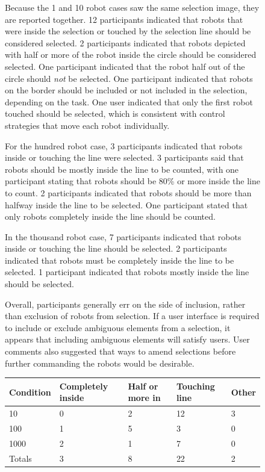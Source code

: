 \begin{subfigure}{0.48\textwidth}
Because the 1 and 10 robot cases saw the same selection image, they are reported together. 
12 participants indicated that robots that were inside the selection or touched by the selection line should be considered selected. 
2 participants indicated that robots depicted with half or more of the robot inside the circle should be considered selected. 
One participant indicated that the robot half out of the circle should \emph{not} be selected. 
One participant indicated that robots on the border should be included or not included in the selection, depending on the task. 
One user indicated that only the first robot touched should be selected, which is consistent with control strategies that move each robot individually. 

For the hundred robot case, 3 participants indicated that robots inside or touching the line were selected. 
3 participants said that robots should be mostly inside the line to be counted, with one participant stating that robots should be 80\% or more inside the line to count. 
2 participants indicated that robots should be more than halfway inside the line to be selected. 
One participant stated that only robots completely inside the line should be counted. 
 
In the thousand robot case, 7 participants indicated that robots inside or touching the line should be selected. 
2 participants indicated that robots must be completely inside the line to be selected. 
1 participant indicated that robots mostly inside the line should be selected. 

Overall, participants generally err on the side of inclusion, rather than exclusion of robots from selection.
If a user interface is required to include or exclude ambiguous elements from a selection, it appears that including ambiguous elements will satisfy users. 
User comments also suggested that ways to amend selections before further commanding the robots would be desirable.  

 \begin{tabular}{ l l l l l}
   Condition & Completely inside & Half or more in & Touching line & Other\\
   \hline
   10 & 0 & 2 & 12 & 3 \\
   
   100 & 1 & 5 & 3 & 0 \\
   1000 & 2 & 1 & 7 & 0\\
   Totals & 3 & 8 & 22 & 2 \\
 \end{tabular}


\end{subfigure}
